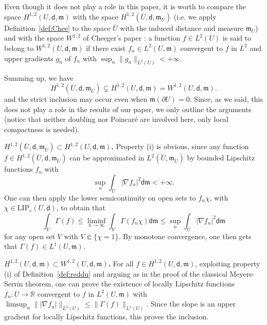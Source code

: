 \documentclass[a4paper,11pt,reqno]{article}
\numberwithin{equation}{section}
\theoremstyle{plain}
\theoremstyle{definition}
\theoremstyle{remark}
\newcommand{\dist}{\mathsf{d}}
\newcommand{\meas}{\mathfrak{m}}
\begin{document}
{\rm \begin{remark}\label{rem:compare}
Even though it does not play a role in this paper, it is worth to compare the space $H^{1,2}(U,\dist,\meas)$ with the space
$H^{1,2}(\overline{U},\dist,\meas_{\overline{U}})$ (i.e. we apply Definition~\ref{def:Chee} to the space $\overline{U}$ with the
induced distance and measure $\meas_{\overline{U}}$) and with the space $W^{1,2}$ of Cheeger's paper \cite{Cheeger}: 
a function $f\in L^2(U)$ is said to belong to $W^{1,2}(U,\dist,\meas)$ if there exist $f_n\in L^2(U,\meas)$ convergent to $f$ 
in $L^2$ and upper gradients $g_n$ of $f_n$ with $\sup_n\|g_n\|_{L^2(U)}<+\infty$. 

Summing up, we have
$$
H^{1,2}(\overline{U},\dist,\meas_{\overline{U}})\subsetneq H^{1,2}(U,\dist,\meas)=W^{1,2}(U,\dist,\meas).
$$
and the strict inclusion may occur even when $\meas(\partial U)=0$. Since, as we said, this does not
play a role in the results of our paper, we only outline the arguments (notice that neither doubling nor
Poincar\'e are involved here, only local compactness is needed).

\smallskip
\noindent
{\bf $H^{1,2}(\overline{U},\dist,\meas_{\overline{U}})\subset H^{1,2}(U,\dist,\meas)$.} Property (i) is obvious,
since any function $f\in H^{1,2}(\overline{U},\dist,\meas_{\overline{U}})$ can be approximated
in $L^2(\overline{U},\meas_{\overline{U}})$ by bounded Lipschitz functions $f_n$ with 
$$
\sup_{n}\int_{\overline{U}}|\nabla f_n|^2\dist\meas<+\infty.
$$
One can then apply the lower semicontinuity on open sets to $f_n\chi$, with $\chi\in \mathrm{LIP}_c(U, \dist)$, to obtain that
$$
\int_V \Gamma(f)\leq\liminf_{n\to\infty}\int_V\Gamma(f_n\chi)\dist\meas\leq
\sup_{n}\int_{\overline{U}}|\nabla f_n|^2\dist\meas
$$
for any open set $V$ with $V\Subset\{\chi=1\}$. By monotone convergence, one then gets
that $\Gamma(f)\in L^1(U,\meas)$.

\smallskip
\noindent
{\bf $H^{1,2}(U,\dist,\meas)\subset W^{1,2}(U,\dist,\meas)$.} For all $f\in H^{1,2}(U,\dist,\meas)$, exploiting
property (i) of Definition~\ref{def:reddu} and arguing as in the proof of the classical Meyers-Serrin theorem,
one can prove the existence of locally Lipschitz functions $f_n:U\to\mathbb R$ convergent to $f$ in $L^2(U,\meas)$ with 
$\limsup_n\||\nabla f_n|\|_{L^2(U)}\leq\|\Gamma(f)\|_{L^1(U)}$. Since the slope is an upper gradient for 
locally Lipschitz functions, this proves the inclusion.


\end{remark}}
\end{document}
